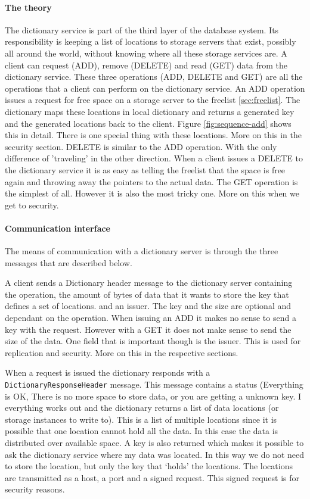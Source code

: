 \documentclass[12pt,a4paper]{scrartcl}
\begin{document}
\paragraph{The theory}
The dictionary service is part of the third layer of the database system. Its responsibility is keeping a list of locations to storage servers that exist, possibly all around the world, without knowing where all these storage services are. A client can request (ADD), remove (DELETE) and read (GET) data from the dictionary service. These three operations (ADD, DELETE and GET) are all the operations that a client can perform on the dictionary service. An ADD operation issues a request for free space on a storage server to the freelist \ref{sec:freelist}. The dictionary maps these locations in local dictionary and returns a generated key and the generated locations back to the client. Figure \ref{fig:sequence-add} shows this in detail. There is one special thing with these locations. More on this in the security section. DELETE is similar to the ADD operation. With the only difference of 'traveling' in the other direction. When a client issues a DELETE to the dictionary service it is as easy as telling the freelist that the space is free again and throwing away the pointers to the actual data. The GET operation is the simplest of all. However it is also the most tricky one. More on this when we get to security.

\paragraph{Communication interface}
The means of communication with a dictionary server is through the three messages that are described below. 

A client sends a Dictionary header message to the dictionary server containing the operation, the amount of bytes of data that it wants to store the key that defines a set of locations. and an issuer. The key and the size are optional and dependant on the operation. When issuing an ADD it makes no sense to send a key with the request. However with a GET it does not make sense to send the size of the data. One field that is important though is the issuer. This is used for replication and security. More on this in the respective sections.

When a request is issued the dictionary responds with a \texttt{DictionaryResponseHeader} message. This message contains a status (Everything is OK, There is no more space to store data, or you are getting a unknown key. I everything works out and the dictionary returns a list of data locations (or storage instances to write to). This is a list of multiple locations since it is possible that one location cannot hold all the data. In this case the data is distributed over available space. A key is also returned which makes it possible to ask the dictionary service where my data was located. In this way we do not need to store the location, but only the key that `holds' the locations. The locations are transmitted as a host, a port and a signed request. This signed request is for security reasons.
\end{document}
